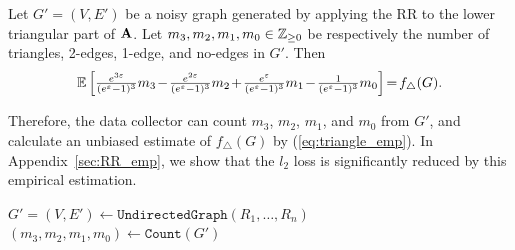 \begin{proposition}\label{prop:triangle_emp}
  Let $G'=(V,E')$ be a noisy graph generated by applying the RR to the lower triangular part of $\mathbf{A}$.
  Let $m_3, m_2, m_1, m_0 \in \mathbb{Z}_{\ge0}$ be respectively the number of triangles, 2-edges, 1-edge, and no-edges in $G'$. 
  Then 
  \begin{align}
      \textstyle{\mathbb{E}\left[ \frac{e^{3\epsilon}}{(e^\epsilon-1)^3} m_3 \hspace{-0.5mm}-\hspace{-0.5mm} \frac{e^{2\epsilon}}{(e^\epsilon-1)^3} m_2 \hspace{-0.5mm}+\hspace{-0.5mm} \frac{e^\epsilon}{(e^\epsilon-1)^3} m_1 \hspace{-0.5mm}-\hspace{-0.5mm} \frac{1}{(e^\epsilon-1)^3} m_0 \right] \hspace{-0.5mm} = \hspace{-0.5mm} f_\triangle(G).}
      \label{eq:triangle_emp}
  \end{align}
\end{proposition}

Therefore, the data collector can count $m_3$, $m_2$, $m_1$, and $m_0$ from $G'$, and calculate an unbiased estimate of $f_\triangle(G)$ by (\ref{eq:triangle_emp}). 
In Appendix~\ref{sec:RR_emp}, we show that the $l_2$ loss is significantly reduced by this empirical estimation.

\setlength{\algomargin}{4mm}
\begin{algorithm}
  \SetAlgoLined
  $G'=(V,E') \leftarrow \texttt{UndirectedGraph}(R_1, \ldots, R_n)$\;
  $(m_3, m_2, m_1, m_0) \leftarrow \texttt{Count}(G')$\;

  \caption{\label{alg:subgraph-rr}}
\end{algorithm}

